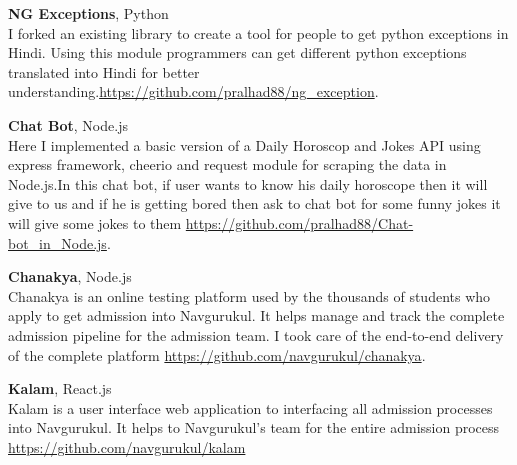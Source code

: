 \documentclass[margin,line]{resume}
\begin{document}
\begin{resume}
    \textbf{NG Exceptions}, Python
    \\ I forked an existing library to create a tool for people to get python exceptions in Hindi. Using this module programmers can get different python exceptions translated into Hindi for better understanding.\url{https://github.com/pralhad88/ng_exception}.

    \textbf{Chat Bot}, Node.js
    \\ Here I implemented a basic version of a Daily Horoscop and Jokes API using express framework, cheerio and request module for scraping the data in Node.js.In this chat bot, if user wants to know his daily horoscope then it will give to us and if he is getting bored then ask to chat bot for some funny jokes it will give some jokes to them \url{https://github.com/pralhad88/Chat-bot_in_Node.js}.

    \textbf{Chanakya}, Node.js
    \\ Chanakya is an online testing platform used by the thousands of students who apply to get admission into Navgurukul. It helps manage and track the complete admission pipeline for the admission team. I took care of the end-to-end delivery of the complete platform \url{https://github.com/navgurukul/chanakya}.

    \textbf{Kalam}, React.js
    \\ Kalam is a user interface web application to interfacing all admission processes into Navgurukul. It helps to Navgurukul’s team for the entire admission process \url{https://github.com/navgurukul/kalam}

\end{resume}
\end{document}
